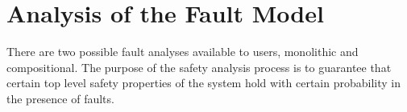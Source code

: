 \section{Analysis of the Fault Model}
\label{sec:fault_analysis}
There are two possible fault analyses available to users, monolithic and compositional. 
The purpose of the safety analysis process is to guarantee that certain top level safety properties of the system hold with certain probability in the presence of faults. 

